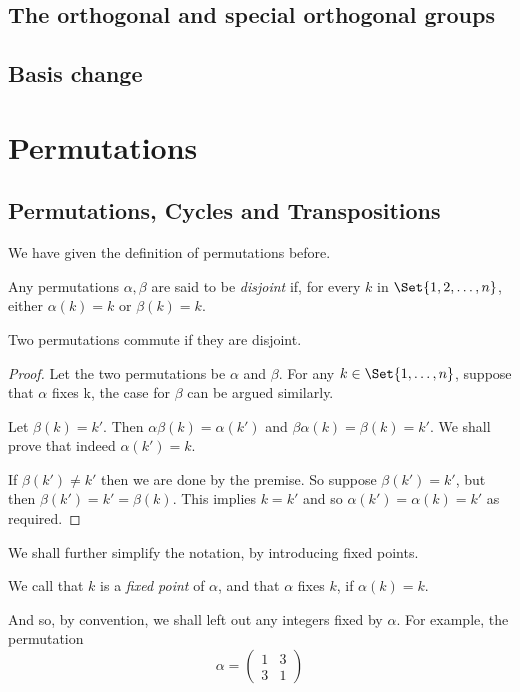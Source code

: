 \documentclass[main.tex]{subfiles}
\begin{document}
			\subsection{The orthogonal and special orthogonal groups}
			
			\subsection{Basis change}
			
		\section{Permutations}
			\subsection{Permutations, Cycles and Transpositions}
				We have given the definition of permutations before.
				\begin{definition}
					Any permutations $\alpha, \beta$ are said to be \textit{disjoint} if, for every $k$ in $\Set{1, 2, \ldots, n}$, either $\alpha(k) = k$ or $\beta(k) = k$.
				\end{definition}
				\begin{theorem}
					Two permutations commute if they are disjoint.
				\end{theorem}
				\begin{proof}
					Let the two permutations be $\alpha$ and $\beta$. For any $k \in \Set{1, \ldots, n}$, suppose that $\alpha$ fixes k, the case for $\beta$ can be argued similarly. 
					
					Let $\beta(k) = k'$. Then $\alpha\beta (k) = \alpha(k')$ and $\beta\alpha(k) = \beta(k) = k'$. We shall prove that indeed $\alpha(k') = k$.
					
					If $\beta(k') \neq k'$ then we are done by the premise. So suppose $\beta(k') = k'$, but then $\beta(k') = k' = \beta(k)$. This implies $k = k'$ and so $\alpha(k') = \alpha(k) = k'$ as required.
				\end{proof}
				We shall further simplify the notation, by introducing fixed points.
				\begin{definition}
					We call that $k$ is a \textit{fixed point}  of $\alpha$, and that $\alpha$ fixes $k$, if $\alpha(k) = k$.
				\end{definition}
				And so, by convention, we shall left out any integers fixed by $\alpha$. For example, the permutation
				\begin{equation*}
				\alpha = \begin{pmatrix}
				1 & 3 \\
				3 & 1
				\end{pmatrix}
				\end{equation*}
\end{document}
